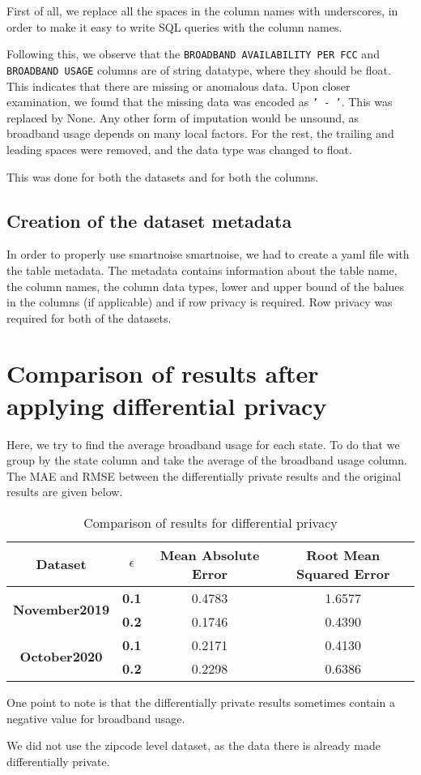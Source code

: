 \documentclass[12pt]{scrartcl}
\theoremstyle{plain}
\theoremstyle{definition}
\theoremstyle{question}
\begin{document}
First of all, we replace all the spaces in the column names with underscores, in order to make it easy to write SQL queries with the column names.

Following this, we observe that the \texttt{BROADBAND AVAILABILITY PER FCC} and \texttt{BROADBAND USAGE} columns are of string datatype, where they should be float. This indicates that there are missing or anomalous data. Upon closer examination, we found that the missing data was encoded as \texttt{' -   '}. This was replaced by None. Any other form of imputation would be unsound, as broadband usage depends on many local factors. For the rest, the trailing and leading spaces were removed, and the data type was changed to float. 

This was done for both the datasets and for both the columns.

\subsection{Creation of the dataset metadata}

In order to properly use smartnoise smartnoise, we had to create a yaml file with the table metadata. The metadata contains information about the table name, the column names, the column data types, lower and upper bound of the balues in the columns (if applicable) and if row privacy is required. Row privacy was required for both of the datasets.

\section{Comparison of results after applying differential privacy}

Here, we try to find the average broadband usage for each state. To do that we group by the state column and take the average of the broadband usage column. The MAE and RMSE between the differentially private results and the original results are given below.

\begin{table}[H]
    \centering
    \begin{tabular}{c|c|c|c}
        \hline
        \textbf{Dataset} & \(\epsilon\) & \textbf{Mean Absolute Error} & \textbf{Root Mean Squared Error} \\ \hline
        \multirow{2}{*}{\textbf{November2019}} & \textbf{0.1} & 0.4783 & 1.6577 \\ \cline{2-4} 
                                               & \textbf{0.2} & 0.1746 & 0.4390 \\ \hline
        \multirow{2}{*}{\textbf{October2020}}  & \textbf{0.1} & 0.2171 & 0.4130 \\ \cline{2-4} 
                                               & \textbf{0.2} & 0.2298 & 0.6386 \\ \hline
        \end{tabular}
    \caption{Comparison of results for differential privacy}
    \label{tab:my-table}
    \end{table}

One point to note is that the differentially private results sometimes contain a negative value for broadband usage. 

We did not use the zipcode level dataset, as the data there is already made differentially private.
\end{document}
